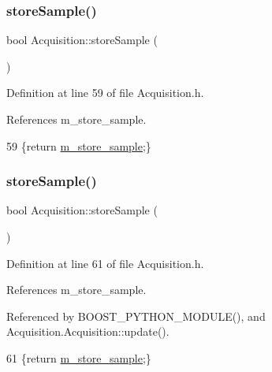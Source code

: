 \subsubsection{\texorpdfstring{store\+Sample()}{storeSample()}\hspace{0.1cm}{\footnotesize\ttfamily [1/2]}}
{\footnotesize\ttfamily bool Acquisition\+::store\+Sample (\begin{DoxyParamCaption}{ }\end{DoxyParamCaption})\hspace{0.3cm}{\ttfamily [inline]}}



Definition at line 59 of file Acquisition.\+h.



References m\+\_\+store\+\_\+sample.


\begin{DoxyCode}
59 \{\textcolor{keywordflow}{return} \hyperlink{classAcquisition_a987cc1d04007cf1f5acc1accfd0909e5}{m\_store\_sample};\}
\end{DoxyCode}
\mbox{\label{classAcquisition_a9af304e0fb2076cd4f92703708efe83e}} 
\subsubsection{\texorpdfstring{store\+Sample()}{storeSample()}\hspace{0.1cm}{\footnotesize\ttfamily [2/2]}}
{\footnotesize\ttfamily bool Acquisition\+::store\+Sample (\begin{DoxyParamCaption}{ }\end{DoxyParamCaption})\hspace{0.3cm}{\ttfamily [inline]}}



Definition at line 61 of file Acquisition.\+h.



References m\+\_\+store\+\_\+sample.



Referenced by B\+O\+O\+S\+T\+\_\+\+P\+Y\+T\+H\+O\+N\+\_\+\+M\+O\+D\+U\+L\+E(), and Acquisition.\+Acquisition\+::update().


\begin{DoxyCode}
61 \{\textcolor{keywordflow}{return} \hyperlink{classAcquisition_a987cc1d04007cf1f5acc1accfd0909e5}{m\_store\_sample};\}
\end{DoxyCode}
\mbox{\label{classAcquisition_a8ab7e58ccb3fee54eb6850e5081fae10}} 
